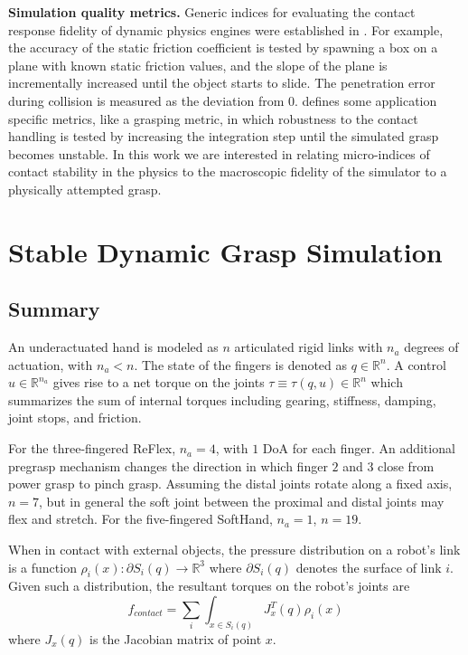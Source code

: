 {\bf Simulation quality metrics.}
Generic indices for evaluating the contact response fidelity of dynamic physics engines were established in \cite{Boeing07}. For example, the accuracy of the static friction coefficient is tested by spawning a box on a plane with known static friction values, and the slope of the plane is incrementally increased until the object starts to slide.  The penetration error during collision is measured as the deviation from 0.  \cite{Erez15} defines some application specific metrics, like a grasping metric, in which robustness to the contact handling is tested by increasing the integration step until the simulated grasp becomes unstable.  In this work we are interested in relating micro-indices of contact stability in the physics to the macroscopic fidelity of the simulator to a physically attempted grasp.

\section{Stable Dynamic Grasp Simulation}
\label{methods}

\subsection{Summary}
An underactuated hand is modeled as  $n$ articulated rigid links with $n_a$ degrees of actuation, with $n_a < n$.  The state of the fingers is denoted as $q \in \mathbb{R}^n$.  A control $u \in \mathbb{R}^{n_a}$ gives rise to a net torque on the joints $\tau \equiv \tau(q,u) \in \mathbb{R}^n$ which summarizes the sum of internal torques including gearing, stiffness, damping, joint stops, and friction.

For the three-fingered ReFlex, $n_a=4$, with $1$ DoA for each finger. An additional pregrasp mechanism changes the direction in which finger $2$ and $3$ close from power grasp to pinch grasp. Assuming the distal joints rotate along a fixed axis, $n=7$, but in general the soft joint between the proximal and distal joints may flex and stretch.
For the five-fingered SoftHand, $n_a=1$, $n=19$.

When in contact with external objects, the pressure distribution on a robot's link is a function $\rho_i(x):\partial S_i(q) \rightarrow \mathbb{R}^3$ where $\partial S_i(q)$ denotes the surface of link $i$. Given such a distribution, the resultant torques on the robot's joints are 
\begin{equation}
f_{contact} = \sum_i \int_{x\in S_i(q)} J_{x}^T(q) \rho_i(x)
\end{equation} where $J_{x}(q)$ is the Jacobian matrix of point $x$.

